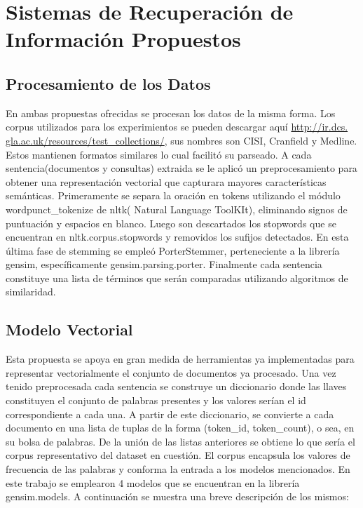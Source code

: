\documentclass{llncs}
\begin{document}
\section{Sistemas de Recuperación de Información Propuestos}


\subsection{Procesamiento de los Datos}

En ambas propuestas ofrecidas se procesan los datos de la misma forma. Los corpus utilizados para los experimientos se pueden descargar aquí \href{http://ir.dcs.gla.ac.uk/resources/test_collections/} {http://ir.dcs. gla.ac.uk/resources/test\_collections/}, sus nombres son CISI, Cranfield y Medline. Estos mantienen formatos similares lo cual facilitó su parseado.
A cada sentencia(documentos y consultas) extraida se le aplicó un preprocesamiento para obtener una representación vectorial que capturara mayores características semánticas. Primeramente se separa la oración en tokens utilizando el módulo wordpunct\_tokenize de nltk( Natural Language ToolKIt), eliminando signos de puntuación y espacios en blanco. Luego son descartados los stopwords que se encuentran en nltk.corpus.stopwords y removidos los sufijos detectados. En esta última fase de stemming se empleó PorterStemmer, perteneciente a la librería gensim, específicamente gensim.parsing.porter. Finalmente cada sentencia constituye una lista de términos que serán comparadas utilizando algoritmos de similaridad.

\subsection{Modelo Vectorial}

Esta propuesta se apoya en gran medida de herramientas ya implementadas para representar vectorialmente el conjunto de documentos ya procesado. Una vez tenido preprocesada cada sentencia se construye un diccionario donde las llaves constituyen el conjunto de palabras presentes y los valores serían el id correspondiente a cada una. A partir de este diccionario, se convierte a cada documento en una lista de tuplas de la forma (token\_id, token\_count), o sea, en su bolsa de palabras. De la unión de las listas anteriores se obtiene lo que sería el corpus representativo del dataset en cuestión.
El corpus encapsula los valores de frecuencia de las palabras y conforma la entrada a los modelos mencionados. En este trabajo se emplearon 4 modelos que se encuentran en la librería gensim.models. A continuación se muestra una breve descripción de los mismos:
\end{document}
